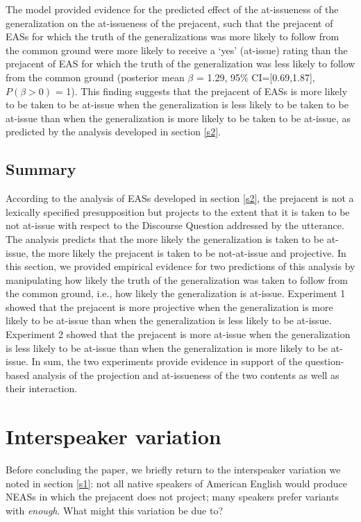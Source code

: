 \documentclass[11pt,fleqn]{article}
\newcommand{\6}{\mbox{$[\hspace*{-.6mm}[$}}
\newcommand{\9}{\mbox{$]\hspace*{-.6mm}]$}}
\begin{document}
The model provided evidence for the predicted effect of the at-issueness of the generalization on the at-issueness of the prejacent, such that the prejacent of EASs for which the truth of the generalizations was more likely to follow from the common ground were more likely to receive a `yes' (at-issue) rating than the prejacent of EAS for which the truth of the generalization was less likely to follow from the common ground  (posterior mean $\beta$ = 1.29, 95\% CI={[}0.69,1.87{]}, $P(\beta > 0)$ = 1). This finding suggests that the prejacent of EASs is more likely to be taken to be at-issue when the generalization is less likely to be taken to be at-issue than when the generalization is more likely to be taken to be at-issue, as predicted by the analysis developed in section \ref{s2}.
  
\subsection{Summary}

According to the analysis of EASs developed in section \ref{s2}, the prejacent is not a lexically specified presupposition but projects to the extent that it is taken to be not at-issue with respect to the Discourse Question addressed by the utterance. The analysis predicts that the more likely the generalization is taken to be at-issue, the more likely the prejacent is taken to be not-at-issue and projective. In this section, we provided empirical evidence for two predictions of this analysis by manipulating how likely the truth of the generalization was taken to follow from the common ground, i.e., how likely the generalization is at-issue. Experiment 1 showed that the prejacent is more projective when the generalization is more likely to be at-issue than when the generalization is less likely to be at-issue. Experiment 2 showed that the prejacent is more at-issue when the generalization is less likely to be at-issue than when the generalization is more likely to be at-issue. In sum, the two experiments provide evidence in support of the question-based analysis of the projection and at-issueness of the two contents as well as their interaction.



\section{Interspeaker variation}\label{s5}

Before concluding the paper, we briefly return to the interspeaker variation we noted in section \ref{s1}: not all native speakers of American English would produce NEASs in which the prejacent does not project; many speakers prefer variants with {\em enough}. What might this variation be due to? 
\end{document}
